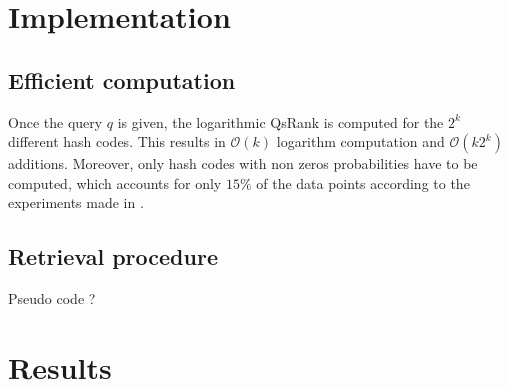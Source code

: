 \documentclass{article}
\begin{document}
\section{Implementation}

\subsection{Efficient computation}

Once the query $q$ is given, the logarithmic QsRank is computed for the $2^k$ different hash codes. This results in $\mathcal{O}(k)$ logarithm computation and $\mathcal{O}(k 2^k)$ additions. Moreover, only hash codes with non zeros probabilities have to be computed, which accounts for only $15\%$ of the data points according to the experiments made in \citep{QSRank}.

\subsection{Retrieval procedure}

Pseudo code ?

\section{Results}

\end{document}
